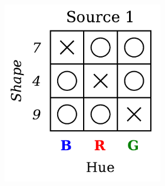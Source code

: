 \begin{dataset}
\begin{figure}[H]
        \begin{subfigure}[b]{0.45\textwidth}
            \centering
            \begin{subfigure}[b]{0.48\textwidth}
                \centering
                \includegraphics[width=\textwidth]{img/datasets/ZGO_fact=hue_env=0.pdf}
            \end{subfigure}
            \begin{subfigure}[b]{0.48\textwidth}
                \centering

\end{subfigure}
\end{subfigure}
\end{figure}
\end{dataset}
